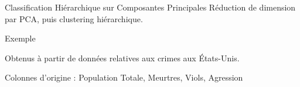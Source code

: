 \begin{frame}{Classification Hiérarchique sur Composantes Principales}
  Réduction de dimension par PCA, puis clustering hiérarchique.

\end{frame}

\begin{frame}{Exemple}

  Obtenus à partir de données relatives aux crimes aux États-Unis.

  Colonnes d'origine : Population Totale, Meurtres, Viols, Agression  
\end{frame}
